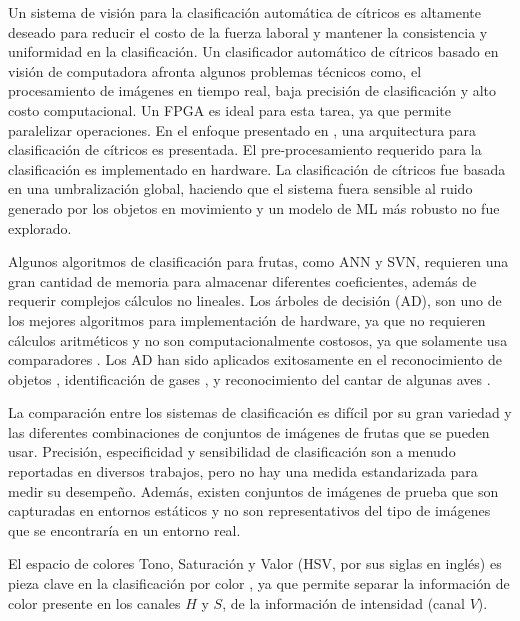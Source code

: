 \documentclass[twoside,spanish,ESP,MSc]{plantillaLabUPV}
\theoremstyle{definition}
\begin{document}




Un sistema de visión para la clasificación automática de cítricos es altamente deseado para reducir el costo de la fuerza laboral y mantener la consistencia y uniformidad en la clasificación. Un clasificador automático de cítricos basado en visión de computadora afronta algunos problemas técnicos como, el procesamiento de imágenes en tiempo real, baja precisión de clasificación y alto costo computacional. Un FPGA es ideal para esta tarea, ya que permite paralelizar operaciones. En el enfoque presentado en \cite{josu}, una arquitectura para clasificación de cítricos es presentada. El pre-procesamiento requerido para la clasificación es implementado en hardware. La clasificación de cítricos fue basada en una umbralización global, haciendo que el sistema fuera sensible al ruido generado por los objetos en movimiento y un modelo de ML más robusto no fue explorado.



Algunos algoritmos de clasificación para frutas, como ANN y SVN, requieren una gran cantidad de memoria para almacenar diferentes coeficientes, además de requerir complejos cálculos no lineales. Los árboles de decisión (AD), son uno de los mejores algoritmos para implementación de hardware, ya que no requieren cálculos aritméticos y no son computacionalmente costosos, ya que solamente usa comparadores \cite{6636881}. Los AD han sido aplicados exitosamente en el reconocimiento de objetos \cite{10.1007/978-3-540-32256-6_52}, identificación de gases \cite{li}, y reconocimiento del cantar de algunas aves \cite{5986215}.



La comparación entre los sistemas de clasificación es difícil por su gran variedad y las diferentes combinaciones de conjuntos de imágenes de frutas que se pueden usar. Precisión, especificidad y sensibilidad de clasificación son a menudo reportadas en diversos trabajos, pero no hay una medida estandarizada para medir su desempeño. Además, existen conjuntos de imágenes de prueba que son capturadas en entornos estáticos y no son representativos del tipo de imágenes que se encontraría en un entorno real.



El espacio de colores Tono, Saturación y Valor (HSV, por sus siglas en inglés) es pieza clave en la clasificación por color \cite{analis,chokun,rgbhisto,huehue,sugarhue}, ya que permite separar la información de color presente en los canales $H$ y $S$, de la información de intensidad (canal $V$).
\end{document}
